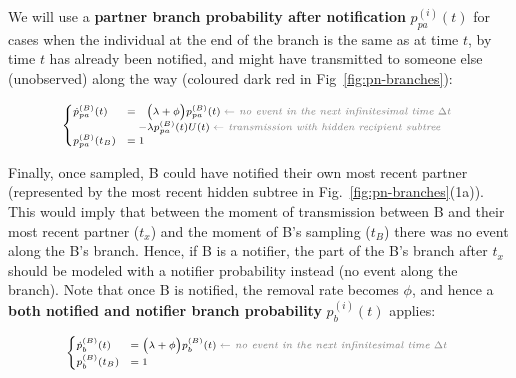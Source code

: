 \documentclass[a4paper,10pt]{article}
\begin{document}
We will use a \textbf{partner branch probability after notification} $p_{pa}^{(i)}(t)$ for cases when the individual at the end of the branch is the same as at time $t$, by time $t$ has already been notified, and might have transmitted to someone else (unobserved) along the way (coloured dark red in Fig~\ref{fig:pn-branches}):

\begin{equation}
\scriptsize
\begin{cases}
\dot{p}_{pa}^{(B)}(t) &=~~  \Big(\lambda + \phi\Big) p_{pa}^{(B)}(t)\; \textit{\color{gray} $\leftarrow$ no event in the next infinitesimal time $\Delta t$ }\\
    &~~~ - \lambda p_{pa}^{(B)}(t)U(t)\;  \textit{\color{gray} $\leftarrow$ transmission with hidden recipient subtree}\\
p_{pa}^{(B)}(t_B) &=  1\label{eq:p-p}
\end{cases}
\end{equation}

Finally, once sampled, B could have notified their own most recent partner (represented by the most recent hidden subtree in Fig.~\ref{fig:pn-branches}(1a)). This would imply that between the moment of transmission between B and their most recent partner ($t_x$) and the moment of B's sampling ($t_B$) there was no event along the B's branch. Hence, if B is a notifier, the part of the B's branch after $t_x$ should be modeled with a notifier probability instead (no event along the branch). 
Note that once B is notified, the removal rate becomes $\phi$, and hence a \textbf{both notified and notifier branch probability} $p_b^{(i)}(t)$ applies:

\begin{equation}
\scriptsize
\begin{cases}
\dot{p}_b^{(B)}(t) &=  \Big(\lambda + \phi\Big) p_b^{(B)}(t)\; \textit{\color{gray} $\leftarrow$ no event in the next infinitesimal time $\Delta t$ }\\
p_b^{(B)}(t_B) &= 1\label{eq:p-b}
\end{cases}
\end{equation}

%
\end{document}
